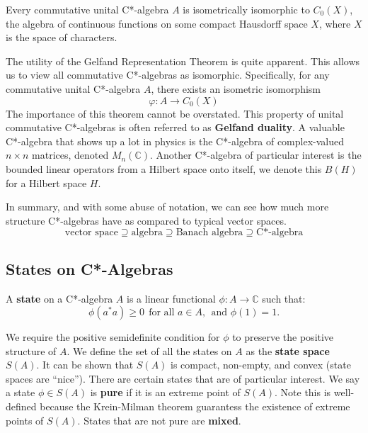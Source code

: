 \begin{theorem}
    Every commutative unital C*-algebra  $A$  is isometrically isomorphic to  $C_0(X)$,
    the algebra of continuous functions on some compact Hausdorff space $X$, where
    $X$ is the space of characters.
\end{theorem}
\vspace{3mm}
The utility of the Gelfand Representation Theorem is quite apparent. This allows
us to view all commutative C*-algebras as isomorphic. Specifically, for any commutative
unital C*-algebra $A$, there exists an isometric isomorphism
\begin{equation*}
    \varphi: A \to C_0(X)
\end{equation*}
The importance of this theorem cannot be overstated. This property of unital commutative
C*-algebras is often referred to as \textbf{Gelfand duality}.
A valuable C*-algebra that shows up a lot in physics is the C*-algebra of complex-valued $n \times n$
matrices, denoted $M_n(\mathbb{C})$. Another C*-algebra of particular interest is
the bounded linear operators from a Hilbert space onto itself, we denote this $B(H)$
for a Hilbert space $H$.

\par

In summary, and with some abuse of notation, we can see how much more structure
C*-algebras have as compared to typical vector spaces.
\begin{equation*}
    \text{vector space} \supseteq \text{algebra} \supseteq \text{Banach algebra} \supseteq \text{C*-algebra}
\end{equation*}

\subsection{States on C*-Algebras}
\begin{definition}
A \textbf{state} on a C*-algebra \( A \) is a linear functional \( \phi: A \to \mathbb{C} \) such that:
\[
\phi(a^*a) \geq 0 \ \  \text{for all } a \in A, \ \  \text{and } \phi(1) = 1.
\]
\end{definition}


We require the positive semidefinite condition for $\phi$ to preserve the positive structure
of $A$. We define the set of all the states on $A$ as the \textbf{state space} $S(A)$. It
can be shown that $S(A)$ is compact, non-empty, and convex (state spaces are ``nice'').
There are certain states that are of particular interest. 
We say a state $\phi \in S(A)$ is \textbf{pure} if it is an extreme point of $S(A)$.
Note this is well-defined because the Krein-Milman theorem guarantess the existence
of extreme points of $S(A)$. States that are not pure are \textbf{mixed}.


